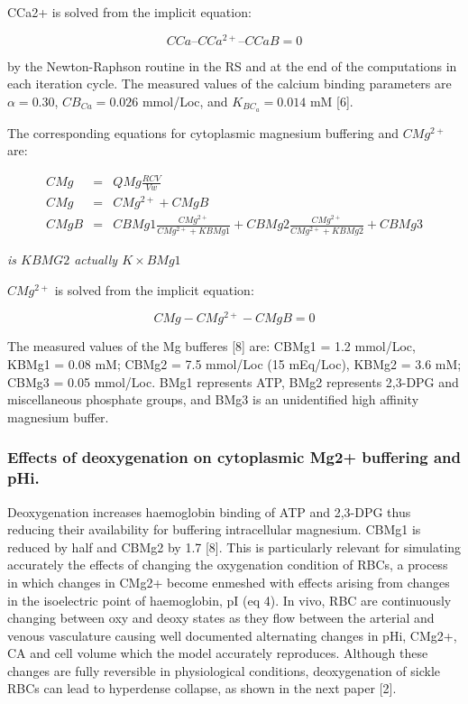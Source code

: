 \documentclass[a4paper]{article}
\newcommand{\cell}[1]{C#1}
\newcommand{\KBCa}{K_{{BC}_a}}
\newcommand{\CMgtp}{\cell{Mg^{2+}}}
\newcommand{\CCatp}{\cell{Ca^{2+}}}
\newcommand{\CCa}{\cell{Ca}}
\newcommand{\CCaB}{\cell{CaB}}
\newcommand{\CBCa}{\cell{B_{Ca}}}
\newcommand{\CMgB}{\cell{MgB}}
\newcommand{\CMg}{\cell{Mg}}
\begin{document}
CCa2+ is solved from the implicit equation: 

\begin{equation}
\CCa – \CCatp – \CCaB = 0  
\end{equation}

by the Newton-Raphson routine in the RS and at the end of the computations in each iteration cycle.  The measured values of the calcium binding parameters are $\alpha = 0.30$, $\CBCa = 0.026$ mmol/Loc, and $\KBCa = 0.014$ mM [6].

The corresponding equations for cytoplasmic magnesium buffering and $CMg^{2+}$ are:

\begin{eqnarray}
\CMg &=& QMg\frac{RCV}{Vw}\\
\CMg &=& \CMgtp + \CMgB\\
\CMgB &=& CBMg1\frac{\CMgtp}{\CMgtp+KBMg1}+CBMg2\frac{\CMgtp}{\CMgtp+KBMg2}+CBMg3
\end{eqnarray}

\emph{is $KBMG2$ actually $K \times BMg1$}

$\CMgtp$ is solved from the implicit equation: 

\begin{equation}
\CMg - \CMgtp - \CMgB = 0
\end{equation}


The measured values of the Mg bufferes [8] are: CBMg1 = 1.2 mmol/Loc, KBMg1 = 0.08 mM; CBMg2 = 7.5 mmol/Loc (15 mEq/Loc), KBMg2 = 3.6 mM; CBMg3 = 0.05 mmol/Loc. BMg1 represents ATP, BMg2 represents 2,3-DPG and miscellaneous phosphate groups, and BMg3 is an unidentified high affinity magnesium buffer.  



\subsubsection{Effects of deoxygenation on cytoplasmic Mg2+ buffering and pHi.}
Deoxygenation increases haemoglobin binding of ATP and 2,3-DPG thus reducing their availability for buffering intracellular magnesium.  CBMg1 is reduced by half and CBMg2 by 1.7 [8].  This is particularly relevant for simulating accurately the effects of changing the oxygenation condition of RBCs, a process in which changes in CMg2+ become enmeshed with effects arising from changes in the isoelectric point of haemoglobin, pI (eq 4).  In vivo, RBC are continuously changing between oxy and deoxy states as they flow between the arterial and venous vasculature causing well documented alternating changes in pHi, CMg2+, CA and cell volume which the model accurately reproduces.  Although these changes are fully reversible in physiological conditions, deoxygenation of sickle RBCs can lead to hyperdense collapse, as shown in the next paper [2]. 
\end{document}
